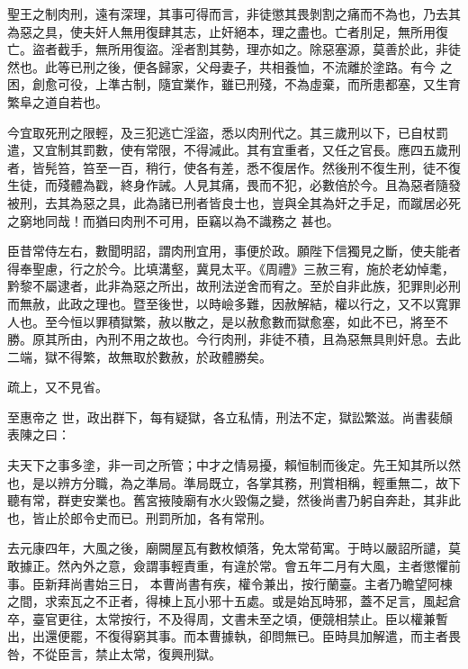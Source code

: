 \begin{pinyinscope}
 聖王之制肉刑，遠有深理，其事可得而言，非徒懲其畏剝割之痛而不為也，乃去其為惡之具，使夫奸人無用復肆其志，止奸絕本，理之盡也。亡者刖足，無所用復亡。盜者截手，無所用復盜。淫者割其勢，理亦如之。除惡塞源，莫善於此，非徒然也。此等已刑之後，便各歸家，父母妻子，共相養恤，不流離於塗路。有今
 之困，創愈可役，上準古制，隨宜業作，雖已刑殘，不為虛棄，而所患都塞，又生育繁阜之道自若也。



 今宜取死刑之限輕，及三犯逃亡淫盜，悉以肉刑代之。其三歲刑以下，已自杖罰遣，又宜制其罰數，使有常限，不得減此。其有宜重者，又任之官長。應四五歲刑者，皆髡笞，笞至一百，稍行，使各有差，悉不復居作。然後刑不復生刑，徒不復生徒，而殘體為戳，終身作誡。人見其痛，畏而不犯，必數倍於今。且為惡者隨發被刑，去其為惡之具，此為諸已刑者皆良士也，豈與全其為奸之手足，而蹴居必死之窮地同哉！而猶曰肉刑不可用，臣竊以為不識務之
 甚也。



 臣昔常侍左右，數聞明詔，謂肉刑宜用，事便於政。願陛下信獨見之斷，使夫能者得奉聖慮，行之於今。比填溝壑，冀見太平。《周禮》三赦三宥，施於老幼悼耄，黔黎不屬逮者，此非為惡之所出，故刑法逆舍而宥之。至於自非此族，犯罪則必刑而無赦，此政之理也。暨至後世，以時嶮多難，因赦解結，權以行之，又不以寬罪人也。至今恒以罪積獄繁，赦以散之，是以赦愈數而獄愈塞，如此不已，將至不勝。原其所由，內刑不用之故也。今行肉刑，非徒不積，且為惡無具則奸息。去此二端，獄不得繁，故無取於數赦，於政體勝矣。



 疏上，又不見省。



 至惠帝之
 世，政出群下，每有疑獄，各立私情，刑法不定，獄訟繁滋。尚書裴頠表陳之曰：



 夫天下之事多塗，非一司之所管；中才之情易擾，賴恒制而後定。先王知其所以然也，是以辨方分職，為之準局。準局既立，各掌其務，刑賞相稱，輕重無二，故下聽有常，群吏安業也。舊宮掖陵廟有水火毀傷之變，然後尚書乃躬自奔赴，其非此也，皆止於郎令史而已。刑罰所加，各有常刑。



 去元康四年，大風之後，廟闕屋瓦有數枚傾落，免太常荀寓。于時以嚴詔所譴，莫敢據正。然內外之意，僉謂事輕責重，有違於常。會五年二月有大風，主者懲懼前事。臣新拜尚書始三日，
 本曹尚書有疾，權令兼出，按行蘭臺。主者乃瞻望阿棟之間，求索瓦之不正者，得棟上瓦小邪十五處。或是始瓦時邪，蓋不足言，風起倉卒，臺官更往，太常按行，不及得周，文書未至之頃，便競相禁止。臣以權兼暫出，出還便罷，不復得窮其事。而本曹據執，卻問無已。臣時具加解遣，而主者畏咎，不從臣言，禁止太常，復興刑獄。




\end{pinyinscope}
